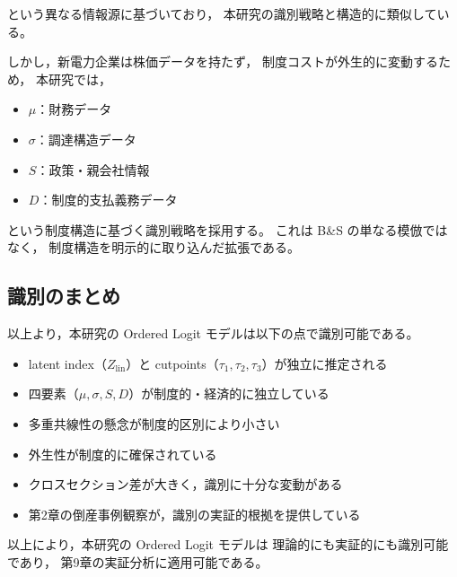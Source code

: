 という異なる情報源に基づいており，
本研究の識別戦略と構造的に類似している。

しかし，新電力企業は株価データを持たず，
制度コストが外生的に変動するため，
本研究では，

\begin{itemize}
    \item $\mu$：財務データ
    \item $\sigma$：調達構造データ
    \item $S$：政策・親会社情報
    \item $D$：制度的支払義務データ
\end{itemize}

という制度構造に基づく識別戦略を採用する。
これは B\&S の単なる模倣ではなく，
制度構造を明示的に取り込んだ拡張である。

\subsection{識別のまとめ}

以上より，本研究の Ordered Logit モデルは以下の点で識別可能である。

\begin{itemize}
    \item latent index（$Z_{\text{lin}}$）と cutpoints（$\tau_1,\tau_2,\tau_3$）が独立に推定される
    \item 四要素（$\mu, \sigma, S, D$）が制度的・経済的に独立している
    \item 多重共線性の懸念が制度的区別により小さい
    \item 外生性が制度的に確保されている
    \item クロスセクション差が大きく，識別に十分な変動がある
    \item 第2章の倒産事例観察が，識別の実証的根拠を提供している
\end{itemize}

以上により，本研究の Ordered Logit モデルは
理論的にも実証的にも識別可能であり，
第9章の実証分析に適用可能である。

